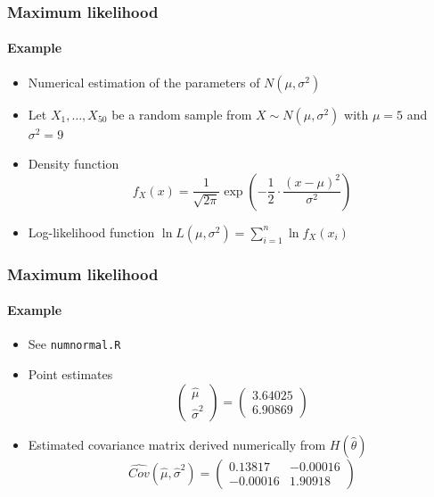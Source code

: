 \documentclass[notes=show]{beamer}
\begin{document}
\begin{frame}\frametitle{Maximum likelihood}\framesubtitle{Example}
\begin{itemize}
    \item Numerical estimation of the parameters of $N(\mu ,\sigma ^{2})$
    \item Let $X_{1},\ldots ,X_{50}$ be a random sample from $X\sim N(\mu,\sigma ^{2})$ \newline
    with $\mu =5$ and $\sigma ^{2}=9$
    \item Density function
    \begin{equation*}
        f_{X}(x)=\frac{1}{\sqrt{2\pi }}\exp \left( -\frac{1}{2}\cdot \frac{\left(x-\mu \right) ^{2}}{\sigma ^{2}}\right)
    \end{equation*}
    \item Log-likelihood function $\ln L\left( \mu ,\sigma ^{2}\right)=\sum_{i=1}^{n}\ln f_{X}(x_{i})$
\end{itemize}
\end{frame}


\begin{frame}\frametitle{Maximum likelihood}\framesubtitle{Example}
\begin{itemize}
    \item See \texttt{numnormal.R}
    \item Point estimates
    \begin{equation*}
        \left(
        \begin{array}{c}
        \hat{\mu} \\
        \hat{\sigma}^{2}
        \end{array}
        \right) =\left(
        \begin{array}{c}
        3.64025 \\
        6.90869%
        \end{array}
        \right)
    \end{equation*}
    \item Estimated covariance matrix derived numerically from $H(\hat{\theta})$
    \begin{equation*}
        \widehat{Cov}\left( \hat{\mu},\hat{\sigma}^{2}\right) =\left(
        \begin{array}{rr}
        0.13817 & -0.00016 \\
        -0.00016 & 1.90918
        \end{array}
    \right)
    \end{equation*}
\end{itemize}
\end{frame}
\end{document}

